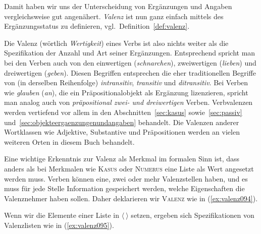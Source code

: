 Damit haben wir uns der Unterscheidung von Ergänzungen und Angaben vergleichsweise gut angenähert.
\textit{Valenz} ist nun ganz einfach mittels des Ergänzungsstatus zu definieren, vgl.\ Definition~\ref{def:valenz}.


Die Valenz (wörtlich \textit{Wertigkeit}) eines Verbs ist also nichts weiter als die Spezifikation der Anzahl und Art seiner Ergänzungen.
Entsprechend spricht man bei den Verben auch von den einwertigen (\textit{schnarchen}), zweiwertigen (\textit{lieben}) und dreiwertigen (\textit{geben}).
Diesen Begriffen entsprechen die eher traditionellen Begriffe von (in derselben Reihenfolge) \textit{intransitiv}, \textit{transitiv} und \textit{ditransitiv}.
Bei Verben wie \textit{glauben} (\textit{an}), die ein Präpositionalobjekt als Ergänzung lizenzieren, spricht man analog auch von \textit{präpositional zwei- und dreiwertigen} Verben.\label{abs:valenz093}
Verb\-valenzen werden vertiefend vor allem in den Abschnitten~\ref{sec:kasus} sowie~\ref{sec:passiv} und~\ref{sec:objekteergaenzungenundangaben} behandelt.
Die Valenzen anderer Wortklassen wie Adjektive, Substantive und Präpositionen werden an vielen weiteren Orten in diesem Buch behandelt.


Eine wichtige Erkenntnis zur Valenz als Merkmal im formalen Sinn ist, dass anders als bei Merkmalen wie \textsc{Kasus} oder \textsc{Numerus} eine Liste als Wert angesetzt werden muss.
Verben können \zB eine, zwei oder mehr Valenzstellen haben, und es muss für jede Stelle Information gespeichert werden, welche Eigenschaften die Valenznehmer haben sollen.
Daher deklarieren wir \textsc{Valenz} wie in (\ref{ex:valenz094}).

\begin{exe}
\end{exe}

Wenn wir die Elemente einer Liste in $\langle\ \rangle$ setzen, ergeben sich Spezifikationen von Valenzlisten wie in (\ref{ex:valenz095}).

\begin{exe}
  \ex\label{ex:valenz095}
  \begin{xlist}
  \end{xlist}
\end{exe}

